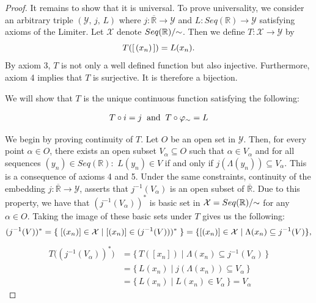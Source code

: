 \documentclass{amsart}
\theoremstyle{definition}
\theoremstyle{plain}
\begin{document}
\begin{proof}
It remains to show that it is universal. 
To prove universality, we consider an arbitrary triple $(\mathcal {Y},\,j,\, {L})$ where $j:\overline{\mathbb{R}} \to \mathcal Y$ and ${L}: Seq(\mathbb{R}) \to \mathcal Y$ satisfying axioms of the Limiter. Let $\mathcal X$ denote $Seq(\mathbb{R})/\hspace{-1mm}\sim$. Then we define $T: \mathcal X \to \mathcal Y$ by
$$T([\hspace{0.5mm}(x_n)\hspace{0.5mm}]) = {L}(x_n).$$
By axiom 3,  $T$ is not only a well defined function but also injective. Furthermore, axiom 4 implies that $T$ is surjective. It is therefore a bijection.

We will show that $T$ is the unique continuous function satisfying the following: 



$$T \circ i = j \hspace{2mm} \text{and} \hspace{2mm} T \circ \varphi_{\sim} = {L}$$ 

We begin by proving continuity of $T$.
Let $O$ be an open set in $\mathcal Y$. Then, for every point $\alpha \in O$, there exists an open subset $V_{\alpha} \subseteq O$ such that $\alpha \in V_{\alpha}$ and  for all sequences 
$(y_n) \in Seq(\mathbb{R}):$  ${L}(y_n) \in V$ if and only if  $j(\Lambda(y_n)) \subseteq V_{\alpha}$. This is a consequence of axioms 4 and 5. 
Under the same constraints, continuity of the embedding $j: \overline{\mathbb{R}} \to \mathcal{Y}$, asserts that $j^{-1}(V_{\alpha})$ is an open subset of $\overline{\mathbb{R}}$. Due to
this property, we have that $(j^{-1}(V_{\alpha}))^*$ is basic set in $\mathcal X= Seq(\mathbb{R})/\hspace{-1mm}\sim$ for any $\alpha \in O$. Taking the image of these basic sets under $T$ gives us the following: 
\[
(j^{-1}(V))^* = \{ \hspace{1mm} [(x_n)]\in \mathcal{X} \hspace{1mm} | \hspace{1mm} [(x_n)] \in  (j^{-1}(V)))^* \hspace{1mm} \} = 
\{[(x_n)]\in \mathcal{X} \hspace{1mm} | \hspace{1mm} \Lambda(x_n) \subseteq j^{-1}(V)\},
\]
\[
\begin{aligned}
T\bigl((j^{-1}(V_{\alpha}))^*\bigr) 
  &= \{\, T([x_n]) \;\big|\; \Lambda(x_n) \subseteq j^{-1}(V_{\alpha}) \,\} \\[4pt]
  &= \{\, {L}(x_n) \;\big|\; j(\Lambda(x_n)) \subseteq V_{\alpha} \,\} \\[4pt]
  &= \{\, {L}(x_n) \;\big|\; {L}(x_n) \in V_{\alpha }\,\}= V_{\alpha}
\end{aligned}
\]




\end{proof}
\end{document}
